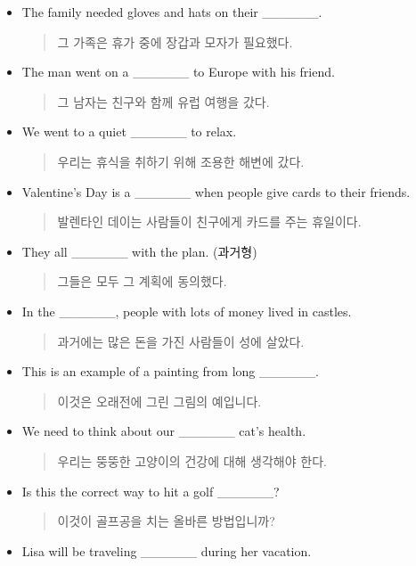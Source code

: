 \documentclass{article}
\begin{document}
\begin{addmargin}[1em]{1em}
\begin{itemize}
\begin{quote}
    \end{quote}
    \item The family needed gloves and hats on their \_\_\_\_\_\_.
    \begin{quote}
    그 가족은 휴가 중에 장갑과 모자가 필요했다.
    \end{quote}
    \newpage
    \item The man went on a \_\_\_\_\_\_ to Europe with his friend.
    \begin{quote}
    그 남자는 친구와 함께 유럽 여행을 갔다.
    \end{quote}
    \item We went to a quiet \_\_\_\_\_\_ to relax.
    \begin{quote}
    우리는 휴식을 취하기 위해 조용한 해변에 갔다.
    \end{quote}
    \item Valentine's Day is a \_\_\_\_\_\_ when people give cards to their friends.
    \begin{quote}
    발렌타인 데이는 사람들이 친구에게 카드를 주는 휴일이다.
    \end{quote}
    \item They all \_\_\_\_\_\_ with the plan. (과거형)
    \begin{quote}
    그들은 모두 그 계획에 동의했다.
    \end{quote}
    \item In the \_\_\_\_\_\_, people with lots of money lived in castles.
    \begin{quote}
    과거에는 많은 돈을 가진 사람들이 성에 살았다.
    \end{quote}
    \item This is an example of a painting from long \_\_\_\_\_\_.
    \begin{quote}
    이것은 오래전에 그린 그림의 예입니다.
    \end{quote}
    \item We need to think about our \_\_\_\_\_\_ cat's health.
    \begin{quote}
    우리는 뚱뚱한 고양이의 건강에 대해 생각해야 한다.
    \end{quote}
    \item Is this the correct way to hit a golf \_\_\_\_\_\_?
    \begin{quote}
    이것이 골프공을 치는 올바른 방법입니까?
    \end{quote}
    \item Lisa will be traveling \_\_\_\_\_\_ during her vacation.
    \begin{quote}

\end{quote}
\end{itemize}
\end{addmargin}
\end{document}
